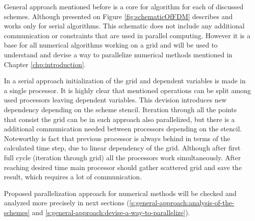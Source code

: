 	General approach mentioned before is a core for algorithm for each of discussed schemes. Although presented on Figure \ref{fig:schematicOfFDM} describes and works only for serial algorithms. This schematic does not include any additional communication or constraints that are used in parallel computing. However it is a base for all numerical algorithms working on a grid and will be used to understand and devise a way to parallelize numerical methods mentioned in Chapter \ref{chp:introduction}.
	
	In a serial approach initialization of the grid and dependent variables is made in a single processor. It is highly clear that mentioned operations can be split among used processors leaving dependent variables. This devision introduces new dependency depending on the scheme \gls{stencil}. Iteration through all the points that consist the grid can be in such approach also parallelized, but there is a additional communication needed between processors depending on the \gls{stencil}. Noteworthy is fact that previous processor is always behind in terms of the calculated time step, due to linear dependency of the grid. Although after first full cycle (iteration through grid) all the processors work simultaneously. After reaching desired time main processor should gather scattered grid and save the result, which requires a lot of communication.
	
	Proposed parallelization approach for numerical methods will be checked and analyzed more precisely in next sections (\ref{s:general-approach:analysis-of-the-schemes} and \ref{s:general-approach:devise-a-way-to-parallelize}).
	
	

\clearpage

\clearpage

